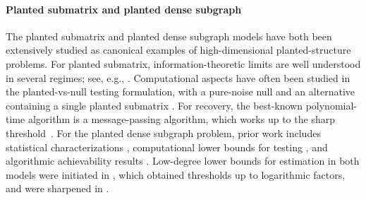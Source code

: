 \documentclass[11pt, letterpaper]{article}
\numberwithin{equation}{section}
\begin{document}
\paragraph*{Planted submatrix and planted dense subgraph}
The planted submatrix and planted dense subgraph models have both been extensively studied as canonical examples of high-dimensional planted-structure problems. For planted submatrix, information-theoretic limits are well understood in several regimes; see, e.g., \cite{butucea2015sharp,ButuceaIngster2013SparseSubmatrixDetection,rotenberg2024planted}. Computational aspects have often been studied in the planted-vs-null testing formulation, with a pure-noise null and an alternative containing a single planted submatrix \cite{ma2015computational,brennan2018reducibility}. For recovery, the best-known polynomial-time algorithm is a message-passing algorithm, which works up to the sharp threshold~\cite{submatrix-message-passing}. For the planted dense subgraph problem, prior work includes statistical characterizations \cite{arias2013community,verzelen2015community,chen2016statistical}, computational lower bounds for testing \cite{hajek2015computational}, and algorithmic achievability results \cite{bhaskara2010detecting,ames2015guaranteed,chen2016statistical,montanari2015finding}. Low-degree lower bounds for estimation in both models were initiated in \cite{schramm2022computational}, which obtained thresholds up to logarithmic factors, and were sharpened in \cite{sohn2025sharp}.
\end{document}

